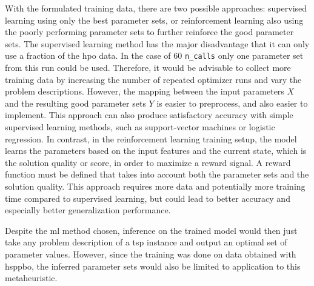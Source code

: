 With the formulated training data, there are two possible approaches: supervised learning using only the best parameter sets, or reinforcement learning also using the poorly performing parameter sets to further reinforce the good parameter sets.
The supervised learning method has the major disadvantage that it can only use a fraction of the \gls{hpo} data. In the case of 60 \texttt{n\_calls} only one parameter set from this run could be used. Therefore, it would be advisable to collect more training data by increasing the number of repeated optimizer runs and vary the problem descriptions. However, the mapping between the input parameters $X$ and the resulting good parameter sets $Y$ is easier to preprocess, and also easier to implement. This approach can also produce satisfactory accuracy with simple supervised learning methods, such as support-vector machines or logistic regression. 
In contrast, in the reinforcement learning training setup, the model learns the parameters based on the input features and the current state, which is the solution quality or score, in order to maximize a reward signal. A reward function must be defined that takes into account both the parameter sets and the solution quality. This approach requires more data and potentially more training time compared to supervised learning, but could lead to better accuracy and especially better generalization performance. 

Despite the \gls{ml} method chosen, inference on the trained model would then just take any problem description of a \gls{tsp} instance and output an optimal set of parameter values. However, since the training was done on data obtained with \gls{hsppbo}, the inferred parameter sets would also be limited to application to this metaheuristic.
